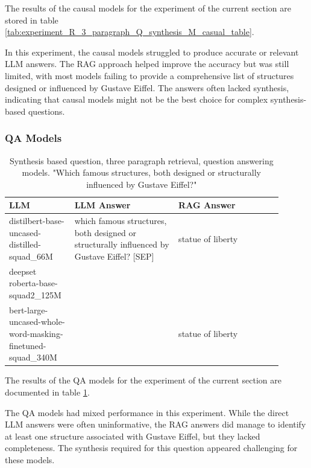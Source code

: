 \documentclass{wseas}
\begin{document}
The results of the causal models for the experiment of the current section
are stored in table \ref{tab:experiment_R_3_paragraph_Q_synthesis_M_casual_table}.

In this experiment, the causal models struggled to produce accurate or
relevant LLM answers. The RAG approach helped improve the accuracy but
was still limited, with most models failing to provide a comprehensive
list of structures designed or influenced by Gustave Eiffel. The answers
often lacked synthesis, indicating that causal models might not be the
best choice for complex synthesis-based questions.


\subsubsection{QA Models}

\begin{table}[htbp]
  \centering
  \label{tab:experiment_R_3_paragraph_Q_synthesis_M_QaModels_table}  %
  \caption{Synthesis based question, three paragraph retrieval, question answering models. "Which famous structures, both designed or structurally influenced by Gustave Eiffel?"} %
  \begin{tabular}{|p{0.20\linewidth}|p{0.35\linewidth}|p{0.35\linewidth}|}
    \hline
    \textbf{LLM} & \textbf{LLM Answer} & \textbf{RAG Answer} \\
    \hline
    distilbert-base-uncased-distilled-squad\_66M & which famous structures, both designed or structurally influenced by Gustave Eiffel? {[}SEP{]} & statue of liberty \\
    \hline
    deepset roberta-base-squad2\_125M & & \\
    \hline
    bert-large-uncased-whole-word-masking-finetuned-squad\_340M & & statue of liberty \\
    \hline
  \end{tabular}
\end{table}

The results of the QA models for the experiment of the current section
are documented in table \ref{tab:experiment_R_3_paragraph_Q_synthesis_M_QaModels_table}.

The QA models had mixed performance in this experiment. While the direct
LLM answers were often uninformative, the RAG answers did manage to
identify at least one structure associated with Gustave Eiffel, but they
lacked completeness. The synthesis required for this question appeared
challenging for these models.
\end{document}
